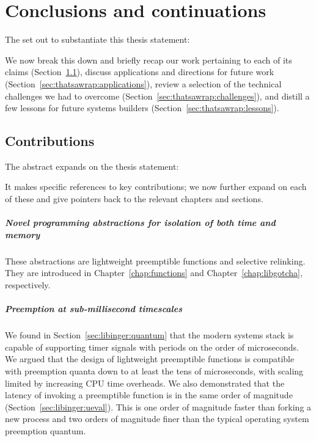 \chapter{Conclusions and continuations}
\label{chap:thatsawrap}

The \thesis set out to substantiate this thesis statement:
\begin{quote}

\end{quote}

We now break this down and briefly recap our work pertaining to each of its claims
(Section~\ref{sec:thatsawrap:contributions}), discuss applications and directions for
future work (Section~\ref{sec:thatsawrap:applications}), review a selection of the
technical challenges we had to overcome (Section~\ref{sec:thatsawrap:challenges}),
and distill a few lessons for future systems builders
(Section~\ref{sec:thatsawrap:lessons}).


\section{Contributions}
\label{sec:thatsawrap:contributions}

The abstract expands on the thesis statement:

\begin{quote}

\end{quote}

It makes specific references to key contributions; we now further expand on each of
these and give pointers back to the relevant chapters and sections.

\paragraph{Novel programming abstractions for isolation of both time and memory}
These abstractions are lightweight preemptible functions and selective relinking.
They are introduced in Chapter~\ref{chap:functions} and Chapter~\ref{chap:libgotcha},
respectively.

\paragraph{Preemption at sub-millisecond timescales}
We found in Section~\ref{sec:libinger:quantum} that the modern systems stack is
capable of supporting timer signals with periods on the order of microseconds.  We
argued that the design of lightweight preemptible functions is compatible with
preemption quanta down to at least the tens of microseconds, with scaling limited by
increasing CPU time overheads.  We also demonstrated that the latency of invoking a
preemptible function is in the same order of magnitude
(Section~\ref{sec:libinger:ueval}).  This is one order of magnitude faster than
forking a new process and two orders of magnitude finer than the typical operating
system preemption quantum.

